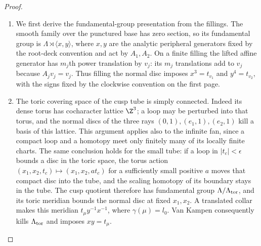 \begin{proof}
\begin{enumerate}[label={$\langle1\rangle$\arabic*.},leftmargin=*]
\item We first derive the fundamental-group presentation from the fillings.
The smooth family over the punctured base has zero section, so its
fundamental group is $\Lambda\rtimes\langle x,y\rangle$, where
$x,y$ are the analytic peripheral generators fixed by the root-deck convention and act by $A_1,A_2$.
On a finite filling the lifted affine generator has $m_j$th power
translation by $v_j$: its $m_j$ translations add to $v_j$ because
$A_jv_j=v_j$. Thus filling the normal disc imposes
$x^3=t_{v_1}$ and $y^4=t_{v_2}$, with the signs fixed by the
clockwise convention on the first page.

\item The toric covering space of the cusp tube is simply connected.
Indeed its dense torus has cocharacter lattice $\Z^3$; a loop may
be perturbed into that torus, and the normal discs of the three rays
$(0,1),(e_1,1),(e_2,1)$ kill a basis of this lattice.
This argument applies also to the infinite fan, since a compact loop
and a homotopy meet only finitely many of its locally finite charts.
The same conclusion holds for the small tube: if a loop in
$|t_c|<\epsilon$ bounds a disc in the toric space, the torus action
$(x_1,x_2,t_c)\mapsto(x_1,x_2,a t_c)$ for a sufficiently small
positive $a$ moves that compact disc into the tube, and the scaling
homotopy of its boundary stays in the tube.
The cusp quotient therefore has fundamental group
$\Lambda/\Lambda_{\rm tor}$, and its toric meridian bounds the
normal disc at fixed $x_1,x_2$. A translated collar makes this
meridian $t_\mu y^{-1}x^{-1}$, where $\gamma(\mu)=l_0$.
Van Kampen consequently kills $\Lambda_{\rm tor}$ and imposes
$xy=t_\mu$.


\end{enumerate}
\end{proof}
